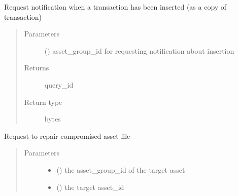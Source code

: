 \documentclass[letterpaper,10pt,english]{sphinxmanual}
\begin{document}
\begin{fulllineitems}
\begin{fulllineitems}
\end{fulllineitems}


\begin{fulllineitems}
\label{\detokenize{bbc1.core.bbc_app:bbc1.core.bbc_app.BBcAppClient.request_insert_completion_notification}}
Request notification when a transaction has been inserted (as a copy of transaction)
\begin{quote}\begin{description}
\item[{Parameters}] \leavevmode
{} () \textendash{} asset\_group\_id for requesting notification about insertion

\item[{Returns}] \leavevmode
query\_id

\item[{Return type}] \leavevmode
bytes

\end{description}\end{quote}

\end{fulllineitems}


\begin{fulllineitems}
\label{\detokenize{bbc1.core.bbc_app:bbc1.core.bbc_app.BBcAppClient.request_to_repair_asset}}
Request to repair compromised asset file
\begin{quote}\begin{description}
\item[{Parameters}] \leavevmode\begin{itemize}
\item {} 
 () \textendash{} the asset\_group\_id of the target asset

\item {} 
 () \textendash{} the target asset\_id


\end{itemize}
\end{description}
\end{quote}
\end{fulllineitems}
\end{fulllineitems}
\end{document}
